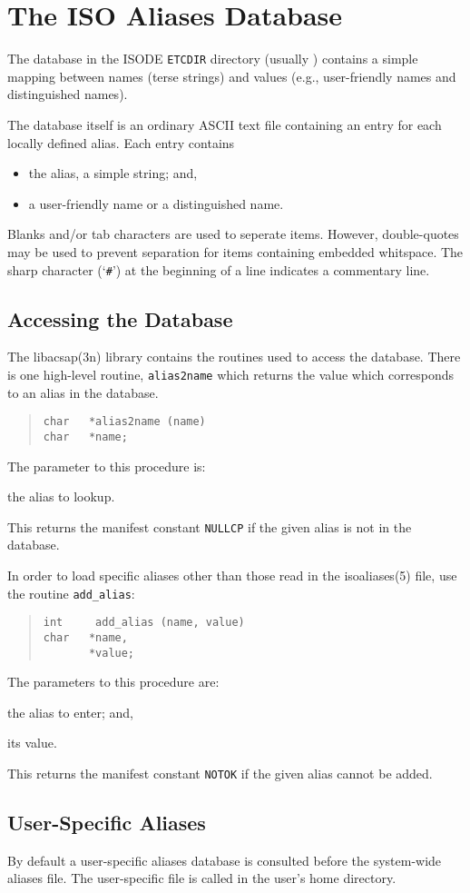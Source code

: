 
\chapter	{The ISO Aliases Database}\label{isoaliases}
The database  in the ISODE \verb"ETCDIR" directory
(usually )
contains a simple mapping between names (terse strings)
and values (e.g., user-friendly names and distinguished names).

The database itself is an ordinary ASCII text file containing an entry for
each locally defined alias.
Each entry contains
\begin{itemize}
\item	the alias, a simple string; and,

\item	a user-friendly name or a distinguished name.
\end{itemize}
Blanks and/or tab characters are used to seperate items.
However, double-quotes may be used to prevent separation for items containing
embedded whitspace.
The sharp character (`\verb"#"') at the beginning of a line indicates a
commentary line.

\section	{Accessing the Database}\label{isoalias}
The \man libacsap(3n) library contains the routines used to access the
database.
There is one high-level routine, \verb"alias2name"
which returns the value which corresponds to an alias in the database.
\begin{quote}\small\begin{verbatim}
char   *alias2name (name)
char   *name;
\end{verbatim}\end{quote}
The parameter to this procedure is:
\begin{describe}
\item[\verb"name":] the alias to lookup.
\end{describe}
This returns the manifest constant \verb"NULLCP" if the given alias is
not in the database.

In order to load specific aliases other than those read in the
\man isoaliases(5) file, use the routine \verb"add_alias":
\begin{quote}\small\begin{verbatim}
int     add_alias (name, value)
char   *name,
       *value;
\end{verbatim}\end{quote}
The parameters to this procedure are:
\begin{describe}
\item[\verb"name":] the alias to enter; and,

\item[\verb"value":] its value.
\end{describe}
This returns the manifest constant \verb"NOTOK" if the given alias cannot
be added.

\section	{User-Specific Aliases}
By default a user-specific aliases database is consulted before the
system-wide aliases file.
The user-specific file is called  in the user's
home directory.
